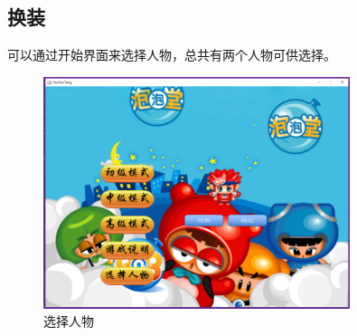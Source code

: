 \documentclass[UTF8, a4paper]{ctexart}
\begin{document}
\subsection{换装}
可以通过开始界面来选择人物，总共有两个人物可供选择。  
 \begin{figure}[H] %
    \centering
    \includegraphics[width=0.80\textwidth]{change.png}
    \caption{选择人物}
    \label{fig:select}
  \end{figure}
\end{document}
